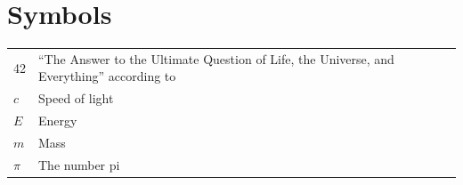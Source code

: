 \documentclass{article}
\begin{document}
\section*{Symbols}
\begin{flushleft}
  \renewcommand{\arraystretch}{1.1}
  \begin{tabularx}{\textwidth}{@{}p{12mm}X@{}}
    42    & ``The Answer to the Ultimate Question of Life, the Universe,
            and Everything'' according to \cite{h2g2} \\
    $c$   & Speed of light \\
    $E$   & Energy \\
    $m$   & Mass \\
    $\pi$ & The number pi \\
  \end{tabularx}
\end{flushleft}















\end{document}
